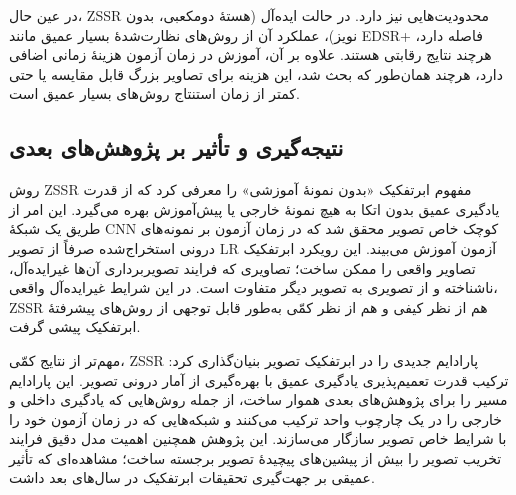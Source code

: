 در عین حال، ZSSR محدودیت‌هایی نیز دارد. در حالت ایده‌آل (هستهٔ
دومکعبی، بدون نویز)، عملکرد آن از روش‌های نظارت‌شدهٔ بسیار عمیق مانند
EDSR+ فاصله دارد، هرچند نتایج رقابتی هستند. علاوه بر آن، آموزش در
زمان آزمون هزینهٔ زمانی اضافی دارد، هرچند همان‌طور که بحث شد، این
هزینه برای تصاویر بزرگ قابل مقایسه یا حتی کمتر از زمان استنتاج
روش‌های بسیار عمیق است.

\subsection{نتیجه‌گیری و تأثیر بر پژوهش‌های بعدی}
\label{subsec:zssr_conclusion}

روش ZSSR \cite{shocher2018zssr} مفهوم ابرتفکیک «بدون نمونهٔ آموزشی»
را معرفی کرد که از قدرت یادگیری عمیق بدون اتکا به هیچ نمونهٔ خارجی
یا پیش‌آموزش بهره می‌گیرد. این امر از طریق یک شبکهٔ CNN کوچک خاص
تصویر محقق شد که در زمان آزمون بر نمونه‌های درونی استخراج‌شده صرفاً
از تصویر LR آزمون آموزش می‌بیند. این رویکرد ابرتفکیک تصاویر واقعی
را ممکن ساخت؛ تصاویری که فرایند تصویربرداری آن‌ها غیرایده‌آل، ناشناخته
و از تصویری به تصویر دیگر متفاوت است. در این شرایط غیرایده‌آل واقعی،
ZSSR هم از نظر کیفی و هم از نظر کمّی به‌طور قابل توجهی از روش‌های
پیشرفتهٔ ابرتفکیک پیشی گرفت.

مهم‌تر از نتایج کمّی، ZSSR پارادایم جدیدی را در ابرتفکیک تصویر
بنیان‌گذاری کرد: ترکیب قدرت تعمیم‌پذیری یادگیری عمیق با بهره‌گیری از
آمار درونی تصویر. این پارادایم مسیر را برای پژوهش‌های بعدی هموار
ساخت، از جمله روش‌هایی که یادگیری داخلی و خارجی را در یک چارچوب واحد
ترکیب می‌کنند و شبکه‌هایی که در زمان آزمون خود را با شرایط خاص
تصویر سازگار می‌سازند. این پژوهش همچنین اهمیت مدل دقیق فرایند
تخریب تصویر را بیش از پیشین‌های پیچیدهٔ تصویر برجسته ساخت؛ مشاهده‌ای
که تأثیر عمیقی بر جهت‌گیری تحقیقات ابرتفکیک در سال‌های بعد داشت.